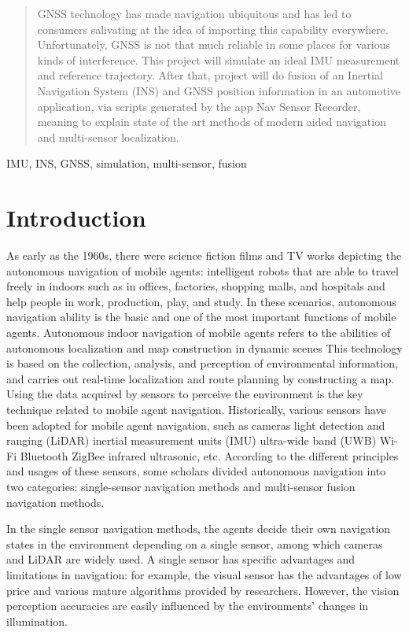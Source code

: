 \documentclass[conference]{IEEEtran}
\begin{document}
\begin{abstract}
GNSS technology has made navigation ubiquitous and has led to consumers salivating at the idea of importing this capability everywhere. Unfortunately, GNSS is not that much reliable in some places for various kinds of interference. This project will simulate an ideal IMU measurement and reference trajectory. After that, project will do fusion of an Inertial Navigation System (INS) and GNSS position information in an automotive application, via scripts generated by the app Nav Sensor Recorder, meaning to explain state of the art methods of modern aided navigation and multi-sensor localization.

\end{abstract}

\begin{IEEEkeywords}
IMU, INS, GNSS, simulation, multi-sensor, fusion
\end{IEEEkeywords}

\section{Introduction}
As early as the 1960s, there were science fiction films and TV works depicting the autonomous navigation of mobile agents: intelligent robots that are able to travel freely in indoors such as in offices, factories, shopping malls, and hospitals and help people in work, production, play, and study. In these scenarios, autonomous navigation ability is the basic and one of the most important functions of mobile agents.
Autonomous indoor navigation of mobile agents refers to the abilities of autonomous localization and map construction in dynamic scenes This technology is based on the collection, analysis, and perception of environmental information, and carries out real-time localization and route planning by constructing a map. Using the data acquired by sensors to perceive the environment is the key technique related to mobile agent navigation. Historically, various sensors have been adopted for mobile agent navigation, such as cameras light detection and ranging (LiDAR) inertial measurement units (IMU) ultra-wide band (UWB) Wi-Fi Bluetooth ZigBee infrared ultrasonic, etc. According to the different principles and usages of these sensors, some scholars divided autonomous navigation into two categories: single-sensor navigation methods and multi-sensor fusion navigation methods.


In the single sensor navigation methods, the agents decide their own navigation states in the environment depending on a single sensor, among which cameras and LiDAR are widely used. A single sensor has specific advantages and limitations in navigation: for example, the visual sensor has the advantages of low price and various mature algorithms provided by researchers. However, the vision perception accuracies are easily influenced by the environments’ changes in illumination. 
\end{document}

